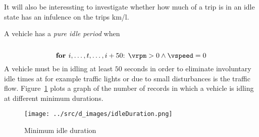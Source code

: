 It will also be interessting to investigate whether how much of a trip is in an idle state has an infulence on the trips km/l.

A vehicle has a \textit{pure idle period} when


\[\]


\[\mbox{\textbf{for }} i, \dots ,t, \dots, i+50 \mbox{: }\vrpm> 0 \wedge \vspeed=0 \]
A vehicle must be in idling at least $50$ seconds in order to eliminate involuntary idle times at for example traffic lights or due to small disturbances is the traffic flow.
Figure~\ref{fig:idleDuration} plots a graph of the number of records in which a vehicle is idling at different minimum durations. 

\begin{figure}[htb]
\centering
\texttt{[image: ../src/d\_images/idleDuration.png]}
\caption{Minimum idle duration}
\label{fig:idleDuration}
\end{figure}

